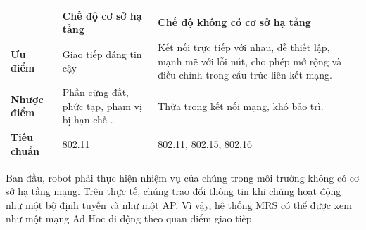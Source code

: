 \documentclass[11pt,openany]{book}
\begin{document}
\begin{algorimth}[H]
\begin{table}[H]
    \label{tab:4.1}
    \begin{tabular}{|l|p{4.5cm}|p{4.5cm}|}\hline
                            & \textbf{Chế độ cơ sở hạ tầng}                 & \textbf{Chế độ không có cơ sở hạ tầng}
        \\\hline
        \textbf{Ưu điểm}    & Giao tiếp đáng tin cậy                        & Kết nối trực tiếp với nhau, dễ thiết lập, mạnh mẽ với lỗi nút, cho phép mở rộng và điều chỉnh trong cấu trúc liên kết mạng. \\\hline
        \textbf{Nhược điểm} & Phần cứng đắt, phức tạp, phạm vị bị hạn chế . & Thừa trong kết nối mạng, khó bảo trì.                                                                                       \\\hline
        \textbf{Tiêu chuẩn} & 802.11                                        & 802.11, 802.15, 802.16                                                                                                      \\\hline
    \end{tabular}
\end{table}
Ban đầu, robot phải thực hiện nhiệm vụ của chúng trong môi trường không có cơ sở hạ tầng mạng. Trên thực tế, chúng trao đổi thông tin khi chúng hoạt động như một bộ định tuyến và như một AP. Vì vậy, hệ thống MRS có thể được xem như một mạng Ad Hoc di động theo quan điểm giao tiếp.

\end{algorimth}
\end{document}
